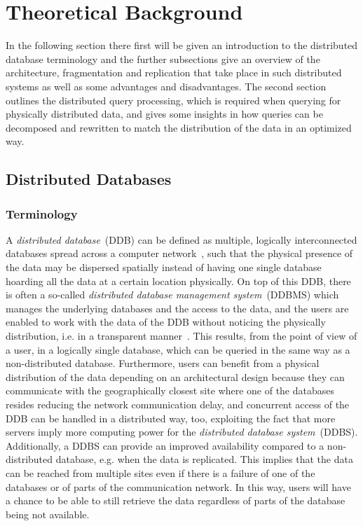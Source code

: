 
\section{Theoretical Background}
\label{sec:theo}

In the following section there first will be given an introduction to the distributed database terminology and the further subsections give an overview of
the architecture, fragmentation and replication that take place in such distributed systems as well as some advantages and disadvantages. The second 
section outlines the distributed query processing, which is required when querying for physically distributed data, and gives some insights in how queries
can be decomposed and rewritten to match the distribution of the data in an optimized way.

\subsection{Distributed Databases}
\label{sec:theo_ddb}

\subsubsection{Terminology}
\label{sec:theo_ddb_term}
A \emph{distributed database}~(DDB) can be defined as multiple, logically interconnected databases spread across a computer network~\cite[p.~4]{Ozsu1991},
such that the physical presence of the data may be dispersed spatially instead of having one single database hoarding all the data at a certain location
physically. On top of this DDB, there is often a so-called \emph{distributed database management system}~(DDBMS) which manages the underlying databases 
and the access to the data, and the users are enabled to work with the data of the DDB without noticing the physically distribution, i.e. in a transparent 
manner~\cite[p.~4f.]{Ozsu1991}.
This results, from the point of view of a user, in a logically single database, which can be queried in the same way as a non-distributed database. 
Furthermore, users can benefit from a physical distribution of the data depending on an architectural design because they can communicate with the 
geographically closest site where one of the databases resides reducing the network communication delay, and concurrent access of the DDB can be handled 
in a distributed way, too, exploiting the fact that more servers imply more computing power for the \emph{distributed database system}~(DDBS).
Additionally, a DDBS can provide an improved availability compared to a non-distributed database, e.g. when the data is replicated. This implies that the
data can be reached from multiple sites even if there is a failure of one of the databases or of parts of the communication network. In this way, users
will have a chance to be able to still retrieve the data regardless of parts of the database being not available.


